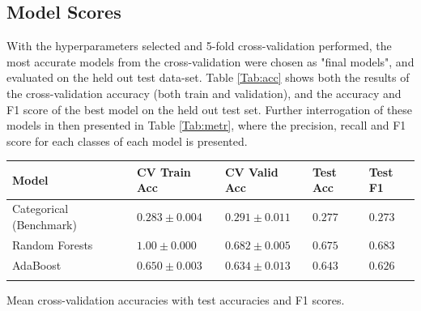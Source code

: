 \documentclass{bioinfo}
\begin{document}


\subsection{Model Scores}
With the hyperparameters selected and 5-fold cross-validation performed, the most accurate models from the cross-validation were chosen as "final models", and evaluated on the held out test data-set. 
Table \ref{Tab:acc} shows both the results of the cross-validation accuracy (both train and validation), and the accuracy and F1 score of the best model on the held out test set.
Further interrogation of these models in then presented in Table \ref{Tab:metr}, where the precision, recall and F1 score for each classes of each model is presented.

\begin{table}[!h]
 {\begin{tabular}{@{}lllll@{}}\toprule Model  & CV Train Acc & CV Valid Acc  & Test Acc & Test F1 \\\midrule
Categorical (Benchmark) & $0.283 \pm 0.004$ & $0.291 \pm 0.011$ & $0.277$ & $0.273$ \\
Random Forests  &  $1.00 \pm 0.000$  &  $0.682 \pm 0.005$ & $0.675$ & $0.683$\\
AdaBoost  & $0.650 \pm 0.003$ & $0.634 \pm 0.013$ & $0.643$ & $0.626$\\\botrule
\end{tabular}}{Mean cross-validation accuracies with test accuracies and F1 scores.}
\end{table}
\end{document}
